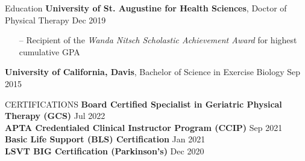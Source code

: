 \documentclass{resume} %
\begin{document}
\vspace{-15pt}
\begin{rSection}{Education}
\textbf{University of St. Augustine for Health Sciences}, Doctor of Physical Therapy \hfill {Dec 2019}
\vspace*{-0.2cm}\begin{itemize}
    \item[--] Recipient of the \textit{Wanda Nitsch Scholastic Achievement Award} for highest cumulative GPA
\end{itemize}
\textbf{University of California, Davis}, Bachelor of Science in Exercise Biology \hfill {Sep 2015}
\end{rSection}


\begin{rSection}{CERTIFICATIONS}
\textbf{Board Certified Specialist in Geriatric Physical Therapy (GCS)} \hfill Jul 2022\\
\textbf{APTA Credentialed Clinical Instructor Program (CCIP)} \hfill Sep 2021\\
\textbf{Basic Life Support (BLS) Certification} \hfill Jan 2021\\
\textbf{LSVT BIG Certification (Parkinson's)} \hfill Dec 2020
\end{rSection}
\end{document}

